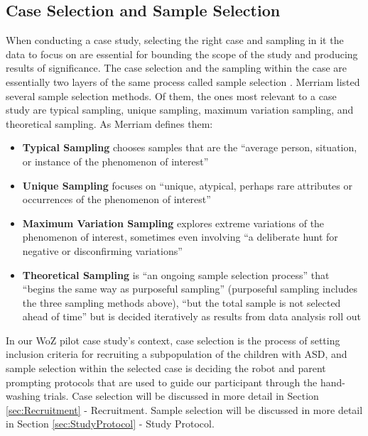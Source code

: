 \subsection{Case Selection and Sample Selection}
\label{sec:CaseSelectionAndSampleSelection}
When conducting a case study, selecting the right case and sampling in it the data to focus on are essential for bounding the scope of the study and producing results of significance.  The case selection and the sampling within the case are essentially two layers of the same process called sample selection \cite{merriam2014qualitative}.  Merriam \cite{merriam2014qualitative} listed several sample selection methods.  Of them, the ones most relevant to a case study are typical sampling, unique sampling, maximum variation sampling, and theoretical sampling. As Merriam defines them:
\begin{itemize}
	\item \textbf{Typical Sampling} chooses samples that are the ``average person, situation, or instance of the phenomenon of interest''
	\item \textbf{Unique Sampling} focuses on ``unique, atypical, perhaps rare attributes or occurrences of the phenomenon of interest''
	\item \textbf{Maximum Variation Sampling} explores extreme variations of the phenomenon of interest, sometimes even involving ``a deliberate hunt for negative or disconfirming variations''
	\item \textbf{Theoretical Sampling}  is ``an ongoing sample selection process'' that ``begins the same way as purposeful sampling'' (purposeful sampling includes the three sampling methods above), ``but the total sample is not selected ahead of time'' but is decided iteratively as results from data analysis roll out
\end{itemize}

In our WoZ pilot case study's context, case selection is the process of setting inclusion criteria for recruiting a subpopulation of the children with ASD, and sample selection within the selected case is deciding the robot and parent prompting protocols that are used to guide our participant through the hand-washing trials.  Case selection will be discussed in more detail in Section \ref{sec:Recruitment} - Recruitment.  Sample selection will be discussed in more detail in Section \ref{sec:StudyProtocol} - Study Protocol.


